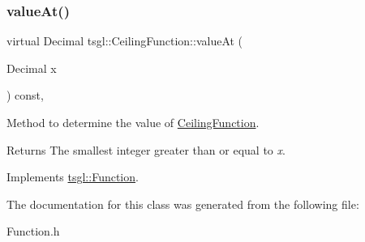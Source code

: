 \subsubsection{\texorpdfstring{value\+At()}{valueAt()}}
{\footnotesize\ttfamily virtual Decimal tsgl\+::\+Ceiling\+Function\+::value\+At (\begin{DoxyParamCaption}\item[{Decimal}]{x }\end{DoxyParamCaption}) const\hspace{0.3cm}{\ttfamily [inline]}, {\ttfamily [virtual]}}



Method to determine the value of \hyperlink{classtsgl_1_1_ceiling_function}{Ceiling\+Function}. 

\begin{DoxyReturn}{Returns}
The smallest integer greater than or equal to {\itshape x}. 
\end{DoxyReturn}


Implements \hyperlink{classtsgl_1_1_function_affb7b3b19a04efefa29a9870d666e912}{tsgl\+::\+Function}.



The documentation for this class was generated from the following file\+:\begin{DoxyCompactItemize}
\item 
Function.\+h\end{DoxyCompactItemize}
